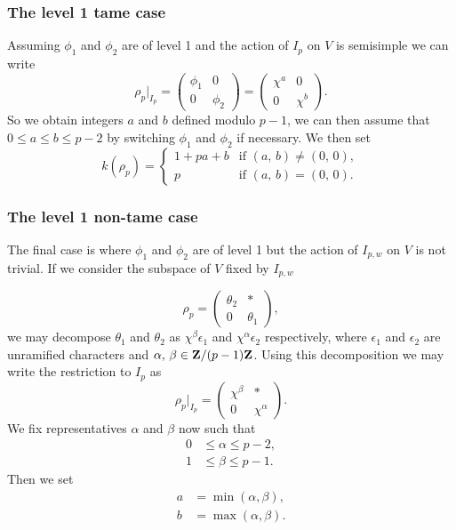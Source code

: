 \documentclass[a4paper,12pt]{article}
\begin{document}
\subsubsection{The level 1 tame case}\label{sec-l1t}
Assuming $\phi_1$ and $\phi_2$ are of level 1 and the action of $I_p$ on $V$ is semisimple we can write
\[
\rho_p |_{I_p} = \begin{pmatrix}
\phi_1 & 0 \\
0      & \phi_2 \end{pmatrix} = \begin{pmatrix}
\chi^a & 0 \\
0      & \chi^b \end{pmatrix}.
\]
So we obtain integers $a$ and $b$ defined modulo $p-1$, we can then assume that $0\le a \le b \le p-2$ by switching $\phi_1$ and $\phi_2$ if necessary.
We then set
\begin{equation}\label{eqn-l1t}
k(\rho_p) = \begin{cases}
1 + pa + b & \text{if }(a,\,b) \ne (0,\,0), \\
         p & \text{if }(a,\,b) = (0,\,0).
\end{cases}
\end{equation}


\subsubsection{The level 1 non-tame case}\label{sec-l1nt}
The final case is where $\phi_1$ and $\phi_2$ are of level 1 but the action of $I_{p,w}$ on $V$ is not trivial.
If we consider the subspace of $V$ fixed by $I_{p,w}$

\[
\rho_p = \begin{pmatrix}
\theta_2 & * \\
0        & \theta_1 \end{pmatrix},
\]
we may decompose $\theta_1$ and $\theta_2$ as $\chi^\beta \epsilon_1$ and $\chi^\alpha \epsilon_2$ respectively, where $\epsilon_1$ and $\epsilon_2$ are unramified characters and $\alpha,\,\beta \in \mathbf{Z}/(p-1)\mathbf{Z}$.
Using this decomposition we may write the restriction to $I_p$ as
\[
\rho_p|_{I_p} = \begin{pmatrix}
\chi^\beta & * \\
0          & \chi^\alpha \end{pmatrix}.
\]
We fix representatives $\alpha$ and $\beta$ now such that
\begin{align*}
0&\le \alpha \le p - 2,\\
1&\le \beta \le p - 1.
\end{align*}
Then we set
\begin{align*}
a &= \min(\alpha, \beta),\\
b &= \max(\alpha, \beta).
\end{align*}
\end{document}
